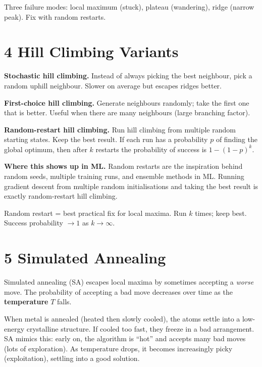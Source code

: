 \documentclass[a4paper,11pt]{article}
\begin{document}
\begin{keytake}
Three failure modes: local maximum (stuck), plateau (wandering), ridge (narrow peak). Fix with random restarts.
\end{keytake}

\section{4 \quad Hill Climbing Variants}

\textbf{Stochastic hill climbing.} Instead of always picking the best neighbour, pick a random uphill neighbour. Slower on average but escapes ridges better.

\textbf{First-choice hill climbing.} Generate neighbours randomly; take the first one that is better. Useful when there are many neighbours (large branching factor).

\textbf{Random-restart hill climbing.} Run hill climbing from multiple random starting states. Keep the best result. If each run has a probability $p$ of finding the global optimum, then after $k$ restarts the probability of success is $1 - (1-p)^k$.

\textbf{Where this shows up in ML.} Random restarts are the inspiration behind random seeds, multiple training runs, and ensemble methods in ML. Running gradient descent from multiple random initialisations and taking the best result is exactly random-restart hill climbing.

\begin{keytake}
Random restart = best practical fix for local maxima. Run $k$ times; keep best. Success probability $\to 1$ as $k \to \infty$.
\end{keytake}

\section{5 \quad Simulated Annealing}

Simulated annealing (SA) escapes local maxima by sometimes accepting a \emph{worse} move. The probability of accepting a bad move decreases over time as the \textbf{temperature} $T$ falls.

\begin{intuition}
When metal is annealed (heated then slowly cooled), the atoms settle into a low-energy crystalline structure. If cooled too fast, they freeze in a bad arrangement. SA mimics this: early on, the algorithm is ``hot'' and accepts many bad moves (lots of exploration). As temperature drops, it becomes increasingly picky (exploitation), settling into a good solution.
\end{intuition}
\end{document}
